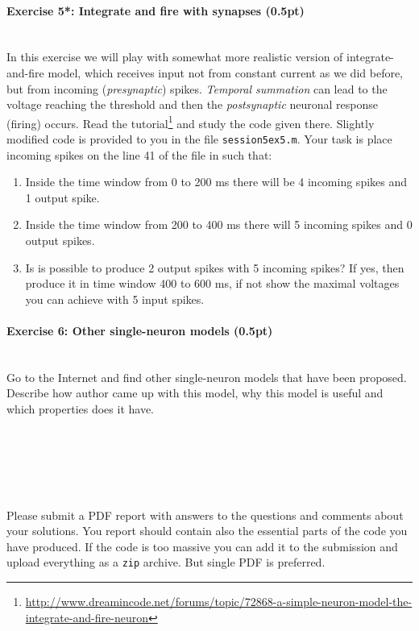 \documentclass[a4paper,11pt]{article}
\newenvironment{exercise}[3]{\paragraph{Exercise #1: #2 (#3pt)}\ \\}{
\medskip}
\begin{document}
%
%
\begin{exercise}{5*}{Integrate and fire with synapses}{0.5}
In this exercise we will play with somewhat more realistic version of integrate-and-fire model, which receives input not from constant current as we did before, but from incoming (\emph{presynaptic}) spikes. \emph{Temporal summation} can lead to the voltage reaching the threshold and then the \emph{postsynaptic} neuronal response (firing) occurs. Read the tutorial\footnote{\url{http://www.dreamincode.net/forums/topic/72868-a-simple-neuron-model-the-integrate-and-fire-neuron}} and study the code given there. Slightly modified code is provided to you in the file \texttt{session5ex5.m}. Your task is place incoming spikes on the line 41 of the file in such that:
\begin{enumerate}
	\item Inside the time window from 0 to 200 ms there will be 4 incoming spikes and 1 output spike.
	\item Inside the time window from 200 to 400 ms there will 5 incoming spikes and 0 output spikes.
	\item Is is possible to produce 2 output spikes with 5 incoming spikes? If yes, then produce it in time window 400 to 600 ms, if not show the maximal voltages you can achieve with 5 input spikes.
\end{enumerate}
\end{exercise}


%
%
\begin{exercise}{6}{Other single-neuron models}{0.5}
Go to the Internet and find other single-neuron models that have been proposed. Describe how author came up with this model, why this model is useful and which properties does it have.
\end{exercise}
\ \\
\ \\
\ \\
\ \\
\ \\
Please submit a PDF report with answers to the questions and comments about your solutions. You report should contain also the essential parts of the code you have produced. If the code is too massive you can add it to the submission and upload everything as a \texttt{zip} archive. But single PDF is preferred.
\end{document}
